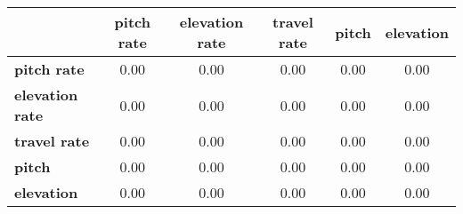 \begin{tiny}\begin{tabular}{|l|c|c|c|c|c|}
\hline
&\textbf{pitch rate}&\textbf{elevation rate}&\textbf{travel rate}&\textbf{pitch}&\textbf{elevation}\\\hline
\textbf{pitch rate}&0.00&0.00&0.00&0.00&0.00\\\hline
\textbf{elevation rate}&0.00&0.00&0.00&0.00&0.00\\\hline
\textbf{travel rate}&0.00&0.00&0.00&0.00&0.00\\\hline
\textbf{pitch}&0.00&0.00&0.00&0.00&0.00\\\hline
\textbf{elevation}&0.00&0.00&0.00&0.00&0.00\\\hline
\end{tabular}
\end{tiny}